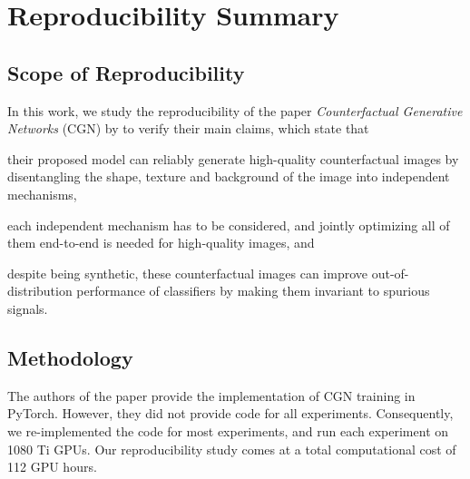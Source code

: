 \section*{\centering Reproducibility Summary}


\subsection*{Scope of Reproducibility}
In this work, we study the reproducibility of the paper \emph{Counterfactual Generative Networks} (CGN) by \citeauthor{Sauer2021ICLR} to verify their main claims, which state that
\begin{enumerate*}[(i)]
    \item their proposed model can reliably generate high-quality counterfactual images by disentangling the shape, texture and background of the image into independent mechanisms,
    \item each independent mechanism has to be considered, and jointly optimizing all of them end-to-end is needed for high-quality images, and
    \item despite being synthetic, these counterfactual images can improve out-of-distribution performance of classifiers by making them invariant to spurious signals.
\end{enumerate*}

\subsection*{Methodology}
The authors of the paper provide the implementation of CGN training in PyTorch. However, they did not provide code for all experiments. Consequently, we re-implemented the code for most experiments, and run each experiment on 1080 Ti GPUs. Our reproducibility study comes at a total computational cost of 112 GPU hours.

